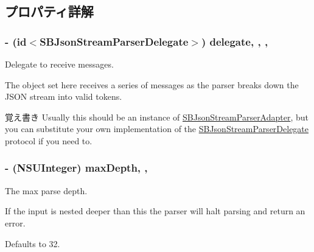 \subsection{プロパティ詳解}
\hypertarget{interface_s_b_json_stream_parser_a1a4e90ce1ca9b55e7696db77ef6bf20c}{}
\subsubsection[{delegate}]{\setlength{\rightskip}{0pt plus 5cm}-\/ (id$<${\bf S\+B\+Json\+Stream\+Parser\+Delegate}$>$) delegate\hspace{0.3cm}{\ttfamily [read]}, {\ttfamily [write]}, {\ttfamily [atomic]}, {}}\label{interface_s_b_json_stream_parser_a1a4e90ce1ca9b55e7696db77ef6bf20c}


Delegate to receive messages. 

The object set here receives a series of messages as the parser breaks down the J\+S\+O\+N stream into valid tokens.

\begin{DoxyNote}{覚え書き}
Usually this should be an instance of \hyperlink{interface_s_b_json_stream_parser_adapter}{S\+B\+Json\+Stream\+Parser\+Adapter}, but you can substitute your own implementation of the \hyperlink{protocol_s_b_json_stream_parser_delegate-p}{S\+B\+Json\+Stream\+Parser\+Delegate} protocol if you need to. 
\end{DoxyNote}
\hypertarget{interface_s_b_json_stream_parser_a1c6f49cb5dd676452994d96498bb5a3f}{}
\subsubsection[{max\+Depth}]{\setlength{\rightskip}{0pt plus 5cm}-\/ (N\+S\+U\+Integer) max\+Depth\hspace{0.3cm}{\ttfamily [read]}, {\ttfamily [write]}, {\ttfamily [atomic]}}\label{interface_s_b_json_stream_parser_a1c6f49cb5dd676452994d96498bb5a3f}


The max parse depth. 

If the input is nested deeper than this the parser will halt parsing and return an error.

Defaults to 32. \hypertarget{interface_s_b_json_stream_parser_afd976c605b67edbb8b7abbebcc5b4093}{}
